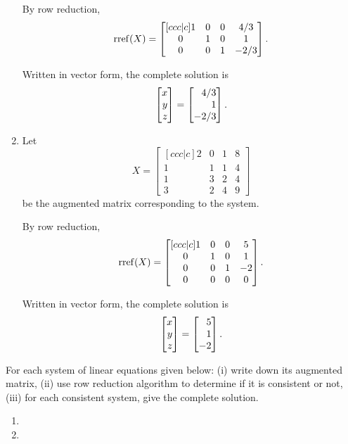 \begin{exercises}
\begin{problist}
\begin{solution}
\begin{enumerate}
				By row reduction,
				\[
					\operatorname{rref}(X)=
					\begin{bmatrix}[ccc|c]
						1 & 0 & 0 & 4/3\\
						0 & 1 & 0 & 1\\
						0 & 0 & 1 & -2/3
					\end{bmatrix}.
				\]
				
				Written in vector form, the complete solution is
				\[
					\mat{x\\y\\z} = \mat{4/3\\1\\-2/3}.
				\]
				\item 
				Let
				\[
					X=
					\begin{bmatrix}[ccc|c]
						2 & 0 & 1 & 8\\
						1 & 1 & 1 & 4\\
						1 & 3 & 2 & 4\\
						3 & 2 & 4 & 9
					\end{bmatrix}
				\]
				be the augmented matrix corresponding to the system.
				
				By row reduction,
				\[
					\operatorname{rref}(X)=
					\begin{bmatrix}[ccc|c]
						1 & 0 & 0 & 5\\
						0 & 1 & 0 & 1\\
						0 & 0 & 1 & -2\\
						0 & 0 & 0 & 0
					\end{bmatrix}.
				\]
				
				Written in vector form, the complete solution is
				\[
					\mat{x\\y\\z} = \mat{5\\1\\-2}.
				\]
			\end{enumerate}
		\end{solution}


		\prob For each system of linear equations given below: (i) write down
		its augmented matrix, (ii) use row reduction algorithm to determine if it
		is consistent or not, (iii) for each consistent system, give the complete
		solution.
		\begin{enumerate}
			\item {}

			\item {}


\end{enumerate}
\end{problist}
\end{exercises}
